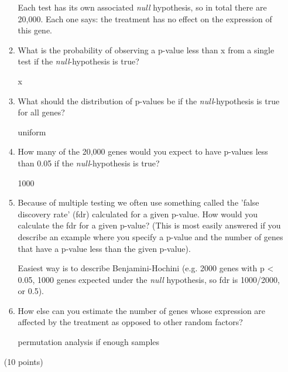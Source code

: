 \documentclass[11pt]{article}
\begin{document}
\begin{enumerate}
\begin{enumerate}
\begin{Notes}
  Each test has its own associated \textit{null} hypothesis, so in total there
  are 20,000. Each one says: the treatment has no effect on the expression of
  this gene.
\end{Notes}
  \item What is the probability of observing a p-value less than
    x from a single test if the \textit{null}-hypothesis is true?
\begin{Notes}
  x
\end{Notes}
  \item What should the distribution of p-values be if the
    \textit{null}-hypothesis is true for all genes?
\begin{Notes}
  uniform
\end{Notes}
  \item How many of the 20,000 genes would you expect to have p-values
    less than 0.05 if the \textit{null}-hypothesis is true?
\begin{Notes}
  1000
\end{Notes}
  \item Because of multiple testing we often use something called the 'false
    discovery rate' (fdr) calculated for a given p-value. How would you
    calculate the fdr for a given p-value? (This is most easily answered if
    you describe an example where you specify a p-value and the number of
    genes that have a p-value less than the given p-value).
\begin{Notes}
  Easiest way is to describe Benjamini-Hochini (e.g. 2000 genes with p < 0.05,
  1000 genes expected under the \textit{null} hypothesis, so fdr is 1000/2000,
  or 0.5).
\end{Notes}
  \item How else can you estimate the number of genes whose expression are
    affected by the treatment as opposed to other random factors?
\begin{Notes}
  permutation analysis if enough samples
\end{Notes}
  \end{enumerate}
(10 points)

\end{enumerate}
\end{document}
